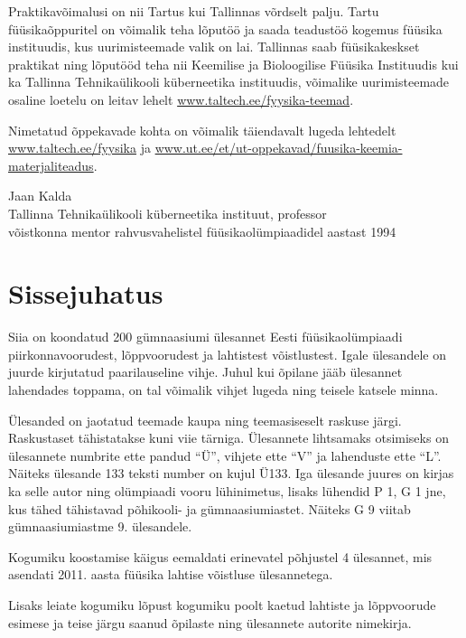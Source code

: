 \documentclass[11pt]{article}
\begin{document}
{{Praktikavõimalusi on nii Tartus kui Tallinnas võrdselt palju.
Tartu füüsikaõppuritel on võimalik teha lõputöö ja saada teadustöö kogemus füüsika instituudis, kus
uurimisteemade valik on lai.
Tallinnas saab füüsikakeskset praktikat ning lõputööd teha nii Keemilise ja Bioloogilise Füüsika Instituudis kui ka
Tallinna Tehnikaülikooli küberneetika instituudis, võimalike uurimisteemade osaline loetelu on leitav lehelt
\url{www.taltech.ee/fyysika-teemad}.

Nimetatud õppekavade kohta on võimalik täiendavalt lugeda lehtedelt
\url{www.taltech.ee/fyysika} ja
\url{www.ut.ee/et/ut-oppekavad/fuusika-keemia-materjaliteadus}.

\vspace{0.5\baselineskip}\noindent
Jaan Kalda\\
Tallinna Tehnikaülikooli küberneetika instituut, professor\\
võistkonna mentor rahvusvahelistel füüsikaolümpiaadidel aastast 1994}
\fussy

\tableofcontents
\newpage

{\setlength{\parindent}{24pt}
\section{Sissejuhatus}

Siia on koondatud 200 gümnaasiumi ülesannet Eesti füüsikaolümpiaadi piirkonnavoorudest, lõppvoorudest ja lahtistest võistlustest. Igale ülesandele on juurde kirjutatud paarilauseline vihje. Juhul kui õpilane jääb ülesannet lahendades toppama, on tal võimalik vihjet lugeda ning teisele katsele minna.

Ülesanded on jaotatud teemade kaupa ning teemasiseselt raskuse järgi. Raskustaset tähistatakse kuni viie tärniga. Ülesannete lihtsamaks otsimiseks on ülesannete numbrite ette pandud \enquote{Ü}, vihjete ette \enquote{V} ja lahenduste ette \enquote{L}. Näiteks ülesande 133 teksti number on kujul Ü133. Iga ülesande juures on kirjas ka selle autor ning olümpiaadi vooru lühinimetus, lisaks lühendid P 1, G 1 jne, kus tähed tähistavad põhikooli- ja gümnaasiumiastet. Näiteks G 9 viitab gümnaasiumiastme 9. ülesandele.

Kogumiku koostamise käigus eemaldati erinevatel põhjustel 4 ülesannet, mis asendati 2011. aasta füüsika lahtise võistluse ülesannetega.

Lisaks leiate kogumiku lõpust kogumiku poolt kaetud lahtiste ja lõppvoorude esimese ja teise järgu saanud õpilaste ning ülesannete autorite nimekirja.}
\newpage
\setlength{\parindent}{0pt}

}
\end{document}
